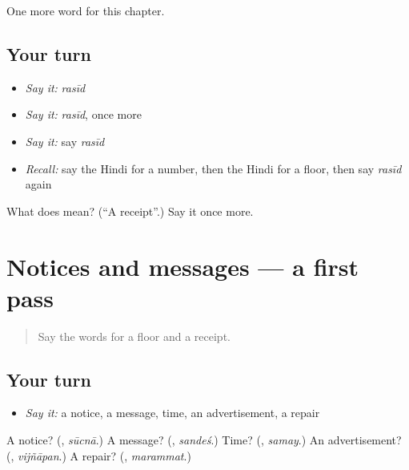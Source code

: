 \begin{grammarlens}[title={What you've built}]
One more word for this chapter.
\end{grammarlens}

\subsection*{Your turn}
\begin{itemize}
\raggedright
  \item \emph{Say it:} \emph{rasīd}
  \item \emph{Say it:} \emph{rasīd}, once more
  \item \emph{Say it:} say \emph{rasīd}
  \item \emph{Recall:} say the Hindi for a number, then the Hindi for a floor, then say \emph{rasīd} again
\end{itemize}

\begin{tcolorbox}[breakable,colback=teal!4,colframe=teal!35!black,title={Before you move on}]
What does  mean? (\textquotedblleft{}A receipt\textquotedblright{}.) Say it once more.
\end{tcolorbox}
\section[(dialogue)]{Notices and messages — a first pass}

\label{lesson:HI-R167-first-pass-notices-and-messages}



\begin{quote}
Say the words for a floor and a receipt.
\end{quote}

\subsection*{Your turn}
\begin{itemize}
\raggedright
  \item \emph{Say it:} a notice, a message, time, an advertisement, a repair
\end{itemize}

\begin{tcolorbox}[breakable,colback=teal!4,colframe=teal!35!black,title={Before you move on}]
A notice? (\textbf{}, \emph{sūcnā}.) A message? (\textbf{}, \emph{sandeś}.) Time? (\textbf{}, \emph{samay}.) An advertisement? (\textbf{}, \emph{vijñāpan}.) A repair? (\textbf{}, \emph{marammat}.)
\end{tcolorbox}
